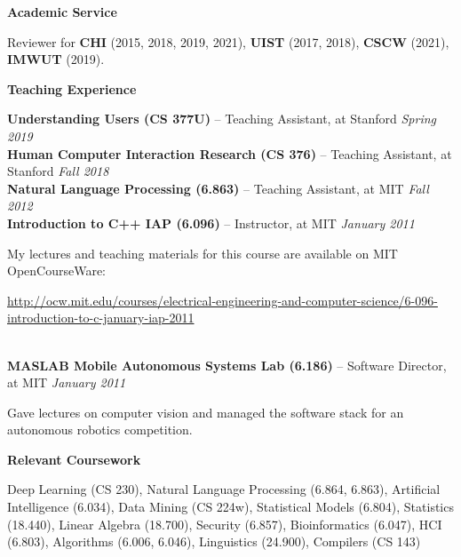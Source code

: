 \documentclass[10pt,A4]{article}
\newcommand{\cvsection}[1]
{
	\begin{center}
		\large\textcolor{sectcol}{\textbf{#1}}
	\end{center}
}
\begin{document}
\cvsection{Academic Service}

Reviewer for \textbf{CHI} (2015, 2018, 2019, 2021), \textbf{UIST} (2017, 2018), \textbf{CSCW} (2021), \textbf{IMWUT} (2019).\\

\cvsection{Teaching Experience}

\textbf{Understanding Users (CS 377U)} -- Teaching Assistant, at Stanford \hfill \textsl{Spring 2019} \\

\textbf{Human Computer Interaction Research (CS 376)} -- Teaching Assistant, at Stanford \hfill \textsl{Fall 2018} \\

\textbf{Natural Language Processing (6.863)} -- Teaching Assistant, at MIT \hfill \textsl{Fall 2012} \\

\textbf{Introduction to C++ IAP (6.096)} -- Instructor, at MIT \hfill \textsl{January 2011}

My lectures and teaching materials for this course are available on MIT OpenCourseWare:

\begin{small}
\url{http://ocw.mit.edu/courses/electrical-engineering-and-computer-science/6-096-introduction-to-c-january-iap-2011}
\end{small} \\

\textbf{MASLAB Mobile Autonomous Systems Lab (6.186)} -- Software Director, at MIT \hfill \textsl{January 2011}

Gave lectures on computer vision and managed the software stack for an autonomous robotics competition.

\cvsection{Relevant Coursework}

Deep Learning (CS 230), Natural Language Processing (6.864, 6.863), Artificial Intelligence (6.034), Data Mining (CS 224w), Statistical Models (6.804), Statistics (18.440), Linear Algebra (18.700), Security (6.857), Bioinformatics (6.047), HCI (6.803), Algorithms (6.006, 6.046), Linguistics (24.900), Compilers (CS 143)\\
\end{document}
